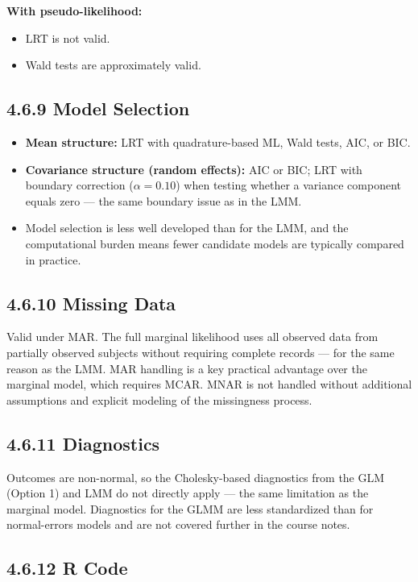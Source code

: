 \documentclass[11pt]{article}
\begin{document}
\textbf{With pseudo-likelihood:}
\begin{itemize}[leftmargin=2em]
  \item LRT is not valid.
  \item Wald tests are approximately valid.
\end{itemize}

\subsection*{4.6.9 Model Selection}

\begin{itemize}[leftmargin=2em]
  \item \textbf{Mean structure:} LRT with quadrature-based ML, Wald tests, AIC, or BIC.
  \item \textbf{Covariance structure (random effects):} AIC or BIC; LRT with boundary correction ($\alpha = 0.10$) when testing whether a variance component equals zero --- the same boundary issue as in the LMM.
  \item Model selection is less well developed than for the LMM, and the computational burden means fewer candidate models are typically compared in practice.
\end{itemize}

\subsection*{4.6.10 Missing Data}

Valid under MAR. The full marginal likelihood uses all observed data from partially observed subjects without requiring complete records --- for the same reason as the LMM. MAR handling is a key practical advantage over the marginal model, which requires MCAR. MNAR is not handled without additional assumptions and explicit modeling of the missingness process.

\subsection*{4.6.11 Diagnostics}

Outcomes are non-normal, so the Cholesky-based diagnostics from the GLM (Option 1) and LMM do not directly apply --- the same limitation as the marginal model. Diagnostics for the GLMM are less standardized than for normal-errors models and are not covered further in the course notes.

\subsection{4.6.12 R Code}
\end{document}
